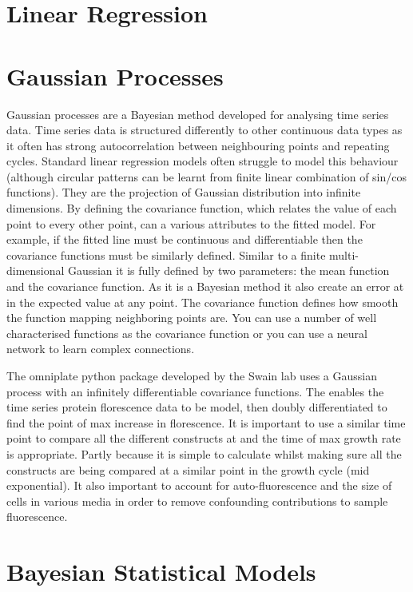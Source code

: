 \documentclass{SBCbookchapter}
\begin{document}
\section{Linear Regression}

\section{Gaussian Processes}
Gaussian processes are a Bayesian method developed for analysing time series data. Time series data is structured differently to other continuous data types as it often has strong autocorrelation between neighbouring points and repeating cycles. Standard linear regression models often struggle to model this behaviour (although circular patterns can be learnt from finite linear combination of sin/cos functions). They are the projection of Gaussian distribution into infinite dimensions. By defining the covariance function, which relates the value of each point to every other point, can a various attributes to the fitted model. For example, if the fitted line must be continuous and differentiable then the covariance functions must be similarly defined. Similar to a finite multi-dimensional Gaussian it is fully defined by two parameters:  the mean function and the covariance function. As it is a Bayesian method it also create an error at in the expected value at any point. The covariance function defines how smooth the function mapping neighboring points are. You can use a number of well characterised functions as the covariance function or you can use a neural network to learn complex connections. 

The omniplate python package developed by the Swain lab uses a Gaussian process with an infinitely differentiable covariance functions. The enables the time series protein florescence data to be model, then doubly differentiated to find the point of max increase in florescence. It is important to use a similar time point to compare all the different constructs at and the time of max growth rate is appropriate. Partly because it is simple to calculate whilst making sure all the constructs are being compared at a similar point in the growth cycle (mid exponential). It also important to account for auto-fluorescence and the size of cells in various media in order to remove confounding contributions to sample fluorescence.

\section{Bayesian Statistical Models}
\end{document}
